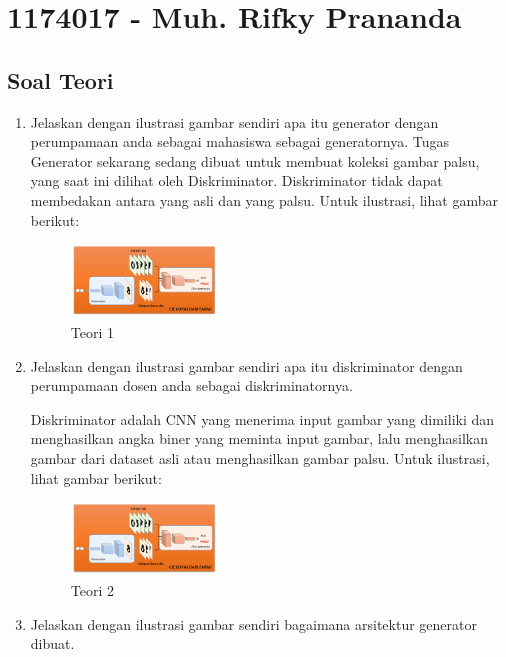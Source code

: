 \section{1174017 - Muh. Rifky Prananda}
\subsection{Soal Teori}
\begin{enumerate}

	\item Jelaskan dengan ilustrasi gambar sendiri apa itu generator dengan perumpamaan anda sebagai mahasiswa sebagai generatornya.
	\hfill\break
	Tugas Generator sekarang sedang dibuat untuk membuat koleksi gambar palsu, yang saat ini dilihat oleh Diskriminator. Diskriminator tidak dapat membedakan antara yang asli dan yang palsu. Untuk ilustrasi, lihat gambar berikut: 

	\begin{figure}[H]
	\centering
		\includegraphics[width=4cm]{figures/1174017/tugas8/materi/teori1,2.PNG}
		\caption{Teori 1}
	\end{figure}

	\item Jelaskan dengan ilustrasi gambar sendiri apa itu diskriminator dengan perumpamaan dosen anda sebagai diskriminatornya.

	\hfill\break
	Diskriminator adalah CNN yang menerima input gambar yang dimiliki dan menghasilkan angka biner yang meminta input gambar, lalu menghasilkan gambar dari dataset asli atau menghasilkan gambar palsu. Untuk ilustrasi, lihat gambar berikut: 

	\begin{figure}[H]
	\centering
		\includegraphics[width=4cm]{figures/1174017/tugas8/materi/teori1,2.PNG}
		\caption{Teori 2}
	\end{figure}
	
	\item Jelaskan dengan ilustrasi gambar sendiri bagaimana arsitektur generator dibuat.


\end{enumerate}
